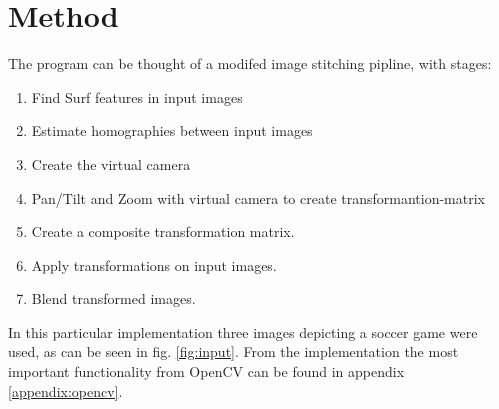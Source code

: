 \section{Method}

The program can be thought of a modifed image stitching pipline, with stages:
\begin{enumerate}
	\item Find Surf features in input images
	\item Estimate homographies between input images
	\item Create the virtual camera
	\item Pan/Tilt and Zoom with virtual camera to create transformantion-matrix
	\item Create a composite transformation matrix.
	\item Apply transformations on input images.
	\item Blend transformed images.
\end{enumerate}

In this particular implementation three images depicting a soccer game were used, as can be seen in fig. \ref{fig:input}. From the implementation the most important functionality from OpenCV can be found in appendix \ref{appendix:opencv}.

